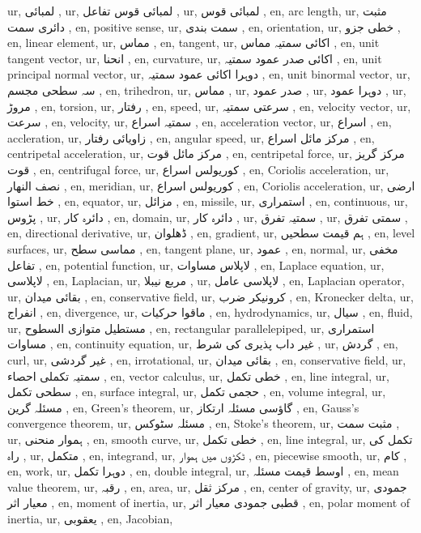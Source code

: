 ur, لمبائی ,
ur, لمبائی قوس تفاعل ,
ur, لمبائی قوس ,
en, arc length,
ur, مثبت دائری سمت ,
en, positive sense,
ur, سمت بندی ,
en, orientation,
ur, خطی جزو ,
en, linear element,
ur, مماس ,
en, tangent,
ur, اکائی سمتیہ مماس ,
en, unit tangent vector,
ur, انحنا ,
en, curvature,
ur, اکائی صدر عمود سمتیہ ,
en, unit principal normal vector,
ur, دوہرا اکائی عمود سمتیہ ,
en, unit binormal vector,
ur, سہ سطحی مجسم ,
en, trihedron,
ur, مماس ,
ur, صدر عمود ,
ur, دوہرا عمود ,
ur, مروڑ ,
en, torsion,
ur, رفتار ,
en, speed,
ur, سرعتی سمتیہ ,
en, velocity vector,
ur, سرعت ,
en, velocity,
ur, سمتیہ اسراع ,
en, acceleration vector,
ur, اسراع ,
en, accleration,
ur, زاویائی رفتار ,
en, angular speed,
ur, مرکز مائل اسراع ,
en, centripetal acceleration,
ur, مرکز مائل قوت ,
en, centripetal force,
ur, مرکز گریز قوت ,
en, centrifugal force,
ur, کوریولس اسراع ,
en, Coriolis acceleration,
ur, نصف النھار ,
en, meridian,
ur, کوریولس اسراع ,
en, Coriolis acceleration,
ur, ارضی خط استوا ,
en, equator,
ur, مزائل ,
en, missile,
ur, استمراری ,
en, continuous,
ur, پڑوس ,
ur, دائرہ کار ,
en, domain,
ur, دائرہ کار ,
ur, سمتیہ تفرق ,
ur, سمتی تفرق ,
en, directional derivative,
ur, ڈھلوان ,
en, gradient,
ur, ہم قیمت سطحیں ,
en, level surfaces,
ur, مماسی سطح ,
en, tangent plane,
ur, عمود ,
en, normal,
ur, مخفی تفاعل ,
en, potential function,
ur, لاپلاس مساوات ,
en, Laplace equation,
ur, لاپلاسی ,
en, Laplacian,
ur, مربع نیبلا ,
ur, لاپلاسی عامل ,
en, Laplacian operator,
ur, بقائی میدان ,
en, conservative field,
ur, کرونیکر ضرب ,
en, Kronecker delta,
ur, انفراج ,
en, divergence,
ur, ماقوا حرکیات ,
en, hydrodynamics,
ur, سیال ,
en, fluid,
ur, مستطیل متوازی السطوح ,
en, rectangular parallelepiped,
ur, استمراری مساوات ,
en, continuity equation,
ur, غیر داب پذیری کی شرط ,
ur, گردش ,
en, curl,
ur, غیر گردشی ,
en, irrotational,
ur, بقائی میدان ,
en, conservative field,
ur, سمتیہ تکملی احصاء ,
en, vector calculus,
ur, خطی تکمل ,
en, line integral,
ur, سطحی تکمل ,
en, surface integral,
ur, حجمی تکمل ,
en, volume integral,
ur, مسئلہ گرین ,
en, Green's theorem,
ur, گاؤسی مسئلہ ارتکاز ,
en, Gauss's convergence theorem,
ur, مسئلہ سٹوکس ,
en, Stoke's theorem,
ur, مثبت سمت ,
ur, ہموار منحنی ,
en, smooth curve,
ur, خطی تکمل ,
en, line integral,
ur, تکمل کی راہ ,
ur, متکمل ,
en, integrand,
ur, ٹکڑوں میں ہموار ,
en, piecewise smooth,
ur, کام ,
en, work,
ur, دوہرا تکمل ,
en, double integral,
ur, اوسط قیمت مسئلہ ,
en, mean value theorem,
ur, رقبہ ,
en, area,
ur, مرکز ثقل ,
en, center of gravity,
ur, جمودی معیار اثر ,
en, moment of inertia,
ur, قطبی جمودی معیار اثر ,
en, polar moment of inertia,
ur, یعقوبی ,
en, Jacobian,
